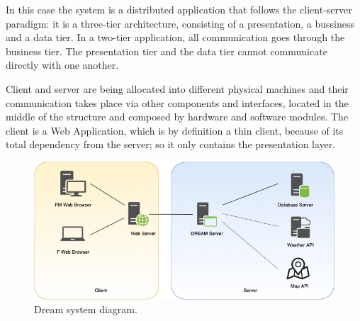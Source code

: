 In this case the system is a distributed application that follows the client-server paradigm: it is a three-tier architecture, consisting of a presentation, a bussiness and a data tier. 
In a two-tier application, all communication goes through the business tier. The presentation tier and the data tier cannot communicate directly with one another. 

Client and server are being allocated into different physical machines and their communication takes place via other components and interfaces, located in the middle of the structure and composed by hardware and software modules. 
The client is a Web Application, which is by definition a thin client, because of its total dependency from the server; so it only contains the presentation layer.

\begin{figure}[H]
    \begin{center}
    \includegraphics[width=1\textwidth]{images/System diagram.png}
    \caption{Dream system diagram.}
    \label{fig:system diagram}
    \end{center}
\end{figure}

